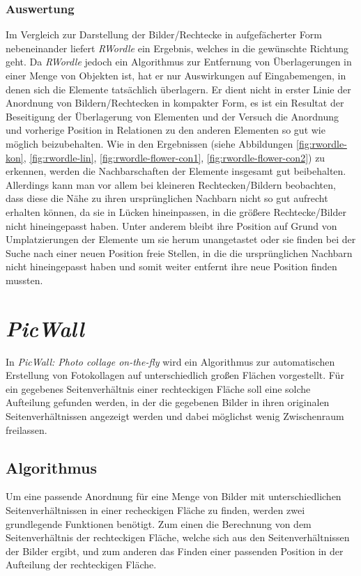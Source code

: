 \documentclass[12pt, ngerman, utf8]{article}
\begin{document}
\subsubsection{Auswertung}
Im Vergleich zur Darstellung der Bilder/Rechtecke in aufgefächerter Form nebeneinander liefert \emph{RWordle} ein Ergebnis, welches in die gewünschte Richtung geht. Da \emph{RWordle} jedoch ein Algorithmus zur Entfernung von Überlagerungen in einer Menge von Objekten ist, hat er nur Auswirkungen auf Eingabemengen, in denen sich die Elemente tatsächlich überlagern. Er dient nicht in erster Linie der Anordnung von Bildern/Rechtecken in kompakter Form, es ist ein Resultat der Beseitigung der Überlagerung von Elementen und der Versuch die Anordnung und vorherige Position in Relationen zu den anderen Elementen so gut wie möglich beizubehalten. Wie in den Ergebnissen (siehe Abbildungen \ref{fig:rwordle-kon}, \ref{fig:rwordle-lin}, \ref{fig:rwordle-flower-con1}, \ref{fig:rwordle-flower-con2}) zu erkennen, werden die Nachbarschaften der Elemente insgesamt gut beibehalten.\\
Allerdings kann man vor allem bei kleineren Rechtecken/Bildern beobachten, dass diese die Nähe zu ihren ursprünglichen Nachbarn nicht so gut aufrecht erhalten können, da sie in Lücken hineinpassen, in die größere Rechtecke/Bilder nicht hineingepasst haben. Unter anderem bleibt ihre Position auf Grund von Umplatzierungen der Elemente um sie herum unangetastet oder sie finden bei der Suche nach einer neuen Position freie Stellen, in die die ursprünglichen Nachbarn nicht hineingepasst haben und somit weiter entfernt ihre neue Position finden mussten.

\section{\textit{PicWall}}
In \textit{PicWall: Photo collage on-the-fly} \cite{picwall} wird ein Algorithmus zur automatischen Erstellung von Fotokollagen auf unterschiedlich großen Flächen vorgestellt. Für ein gegebenes Seitenverhältnis einer rechteckigen Fläche soll eine solche Aufteilung gefunden werden, in der die gegebenen Bilder in ihren originalen Seitenverhältnissen angezeigt werden und dabei möglichst wenig Zwischenraum freilassen.

\subsection{Algorithmus}
Um eine passende Anordnung für eine Menge von Bilder mit unterschiedlichen Seitenverhältnissen in einer recheckigen Fläche zu finden, werden zwei grundlegende Funktionen benötigt. Zum einen die Berechnung von dem Seitenverhältnis der rechteckigen Fläche, welche sich aus den Seitenverhältnissen der Bilder ergibt, und zum anderen das Finden einer passenden Position in der Aufteilung der rechteckigen Fläche. 
\end{document}
